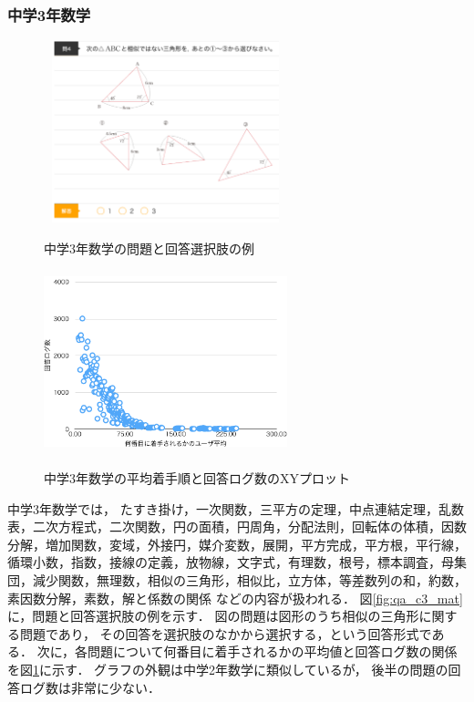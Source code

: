\subsubsection{中学3年数学}
\begin{figure}[ht]
\begin{center}
	\includegraphics[width=200pt, height=150pt]{./img/qa_c3_mat.png}
	\caption{中学3年数学の問題と回答選択肢の例}
	\label{fig:qa_c3_mat}
\endminipage\hfill
{}
	\includegraphics[width=200pt, height=150pt]{./img/stats_c3_mat.pdf}
	\caption{中学3年数学の平均着手順と回答ログ数のXYプロット}
	\label{fig:stats_c3_mat}
\endminipage\hfill
\end{center}
\end{figure}
中学3年数学では，
たすき掛け，一次関数，三平方の定理，中点連結定理，乱数表，二次方程式，二次関数，円の面積，円周角，分配法則，回転体の体積，因数分解，増加関数，変域，外接円，媒介変数，展開，平方完成，平方根，平行線，循環小数，指数，接線の定義，放物線，文字式，有理数，根号，標本調査，母集団，減少関数，無理数，相似の三角形，相似比，立方体，等差数列の和，約数，素因数分解，素数，解と係数の関係
などの内容が扱われる．
図\ref{fig:qa_c3_mat}に，問題と回答選択肢の例を示す．
図の問題は図形のうち相似の三角形に関する問題であり，
その回答を選択肢のなかから選択する，という回答形式である．
次に，各問題について何番目に着手されるかの平均値と回答ログ数の関係を図\ref{fig:stats_c3_mat}に示す．
グラフの外観は中学2年数学に類似しているが，
後半の問題の回答ログ数は非常に少ない．


